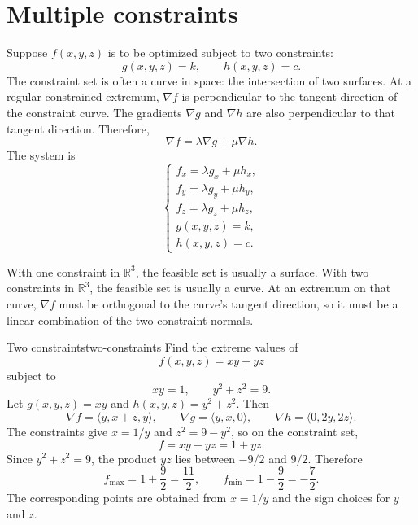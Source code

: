 \documentclass[11pt]{article}
\newcommand{\R}{\mathbb R}
\newcommand{\grad}{\nabla}
\begin{document}
\section{Multiple constraints}

Suppose $f(x,y,z)$ is to be optimized subject to two constraints:
\[
g(x,y,z)=k,
\qquad
h(x,y,z)=c.
\]
The constraint set is often a curve in space: the intersection of two surfaces. At a regular constrained extremum, $\grad f$ is perpendicular to the tangent direction of the constraint curve. The gradients $\grad g$ and $\grad h$ are also perpendicular to that tangent direction. Therefore,
\[
\grad f=\lambda \grad g+\mu \grad h.
\]
The system is
\[
\begin{cases}
f_x=\lambda g_x+\mu h_x,\\
f_y=\lambda g_y+\mu h_y,\\
f_z=\lambda g_z+\mu h_z,\\
g(x,y,z)=k,\\
h(x,y,z)=c.
\end{cases}
\]

\begin{notebox}
With one constraint in $\R^3$, the feasible set is usually a surface. With two constraints in $\R^3$, the feasible set is usually a curve. At an extremum on that curve, $\grad f$ must be orthogonal to the curve's tangent direction, so it must be a linear combination of the two constraint normals.
\end{notebox}

\begin{workedexample}{Two constraints}{two-constraints}
Find the extreme values of
\[
f(x,y,z)=xy+yz
\]
subject to
\[
xy=1,
\qquad y^2+z^2=9.
\]
Let $g(x,y,z)=xy$ and $h(x,y,z)=y^2+z^2$. Then
\[
\grad f=\langle y,x+z,y\rangle,
\qquad
\grad g=\langle y,x,0\rangle,
\qquad
\grad h=\langle 0,2y,2z\rangle.
\]
The constraints give $x=1/y$ and $z^2=9-y^2$, so on the constraint set,
\[
f=xy+yz=1+yz.
\]
Since $y^2+z^2=9$, the product $yz$ lies between $-9/2$ and $9/2$. Therefore
\[
f_{\max}=1+\frac92=\frac{11}{2},
\qquad
f_{\min}=1-\frac92=-\frac72.
\]
The corresponding points are obtained from $x=1/y$ and the sign choices for $y$ and $z$.
\end{workedexample}
\end{document}
